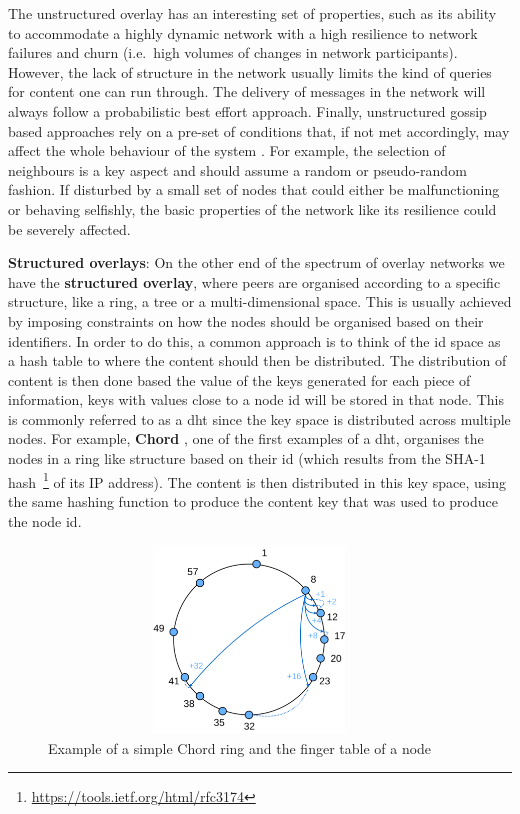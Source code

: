 The unstructured overlay has an interesting set of properties, such as
its ability to accommodate a highly dynamic network with a high
resilience to network failures and churn (i.e.~high volumes of changes
in network participants). However, the lack of structure in the network
usually limits the kind of queries for content one can run through. The
delivery of messages in the network will always follow a probabilistic
best effort approach. Finally, unstructured gossip based approaches rely
on a pre-set of conditions that, if not met accordingly, may affect the
whole behaviour of the system \cite{Alvisi2007}. For example, the selection of
neighbours is a key aspect and should assume a random or pseudo-random
fashion. If disturbed by a small set of nodes that could either be
malfunctioning or behaving selfishly, the basic properties of the
network like its resilience could be severely affected.
\bigskip

\textbf{Structured overlays}: On the other end of the spectrum of overlay
networks we have the \textbf{structured overlay}, where peers are organised
according to a specific structure, like a ring, a tree or a multi-dimensional
space. This is usually achieved by imposing constraints on how the nodes should
be organised based on their identifiers. In order to do this, a common approach
is to think of the \acrshort{id} space as a hash table to where the content
should then be distributed. The distribution of content is then done based the
value of the keys generated for each piece of information, keys with values
close to a node \acrshort{id} will be stored in that node. This is commonly
referred to as a \acrfull{dht} since the key space is distributed across
multiple nodes. For example, \textbf{Chord} \cite{Stoica2001}, one of the first
examples of a \acrshort{dht}, organises the nodes in a ring like structure
based on their \acrshort{id} (which results from the SHA-1
hash~\footnote{\url{https://tools.ietf.org/html/rfc3174}} of its IP address).
The content is then distributed in this key space, using the same hashing
function to produce the content key that was used to produce the node
\acrshort{id}.

\begin{figure}[hb!]
  \centering
  \includegraphics[max height=5cm,max width=0.95\textwidth]{../images/chord.png}
  \caption{Example of a simple Chord ring and the finger table of a node}
  \label{fig:chord}
\end{figure}

